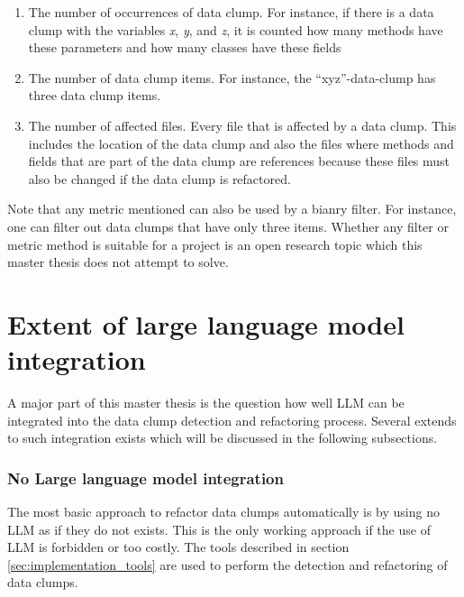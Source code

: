 \begin{enumerate}

    \item The number of occurrences of data clump. For instance, if there is a data clump with the variables \textit{x}, \textit{y}, and  \textit{z}, it is counted how many methods have these parameters and how many classes have these fields

     \item The number of data clump items. For instance, the \enquote{xyz}-data-clump has three data clump items.
     
    \item The number of affected files. Every file that is affected by a data clump. This includes the location of the data clump and also the files where methods and fields that are part of the data clump are references because these files must also be changed if the data clump is refactored. 
    
\end{enumerate}

Note that any metric mentioned can also be used by a bianry filter. For instance, one can filter out data clumps that have only three items.
Whether any filter or metric method is suitable for a project is an open research topic which this master thesis does not attempt to solve. 






\label{sec:implementation_tools}





\section{Extent of large language model integration}

A major part of this master thesis is the question how well \ac{LLM} can be integrated into the data clump  detection and refactoring process. Several extends to such integration exists which will be discussed in the following subsections. 

\subsubsection{No Large language model integration}

The most basic approach to refactor data clumps automatically is by using no \ac{LLM} as if they do not exists. This is the only working approach if the use of  \ac{LLM} is forbidden or too costly. The tools described in section \ref{sec:implementation_tools} are used to perform the detection and refactoring of data clumps. 


